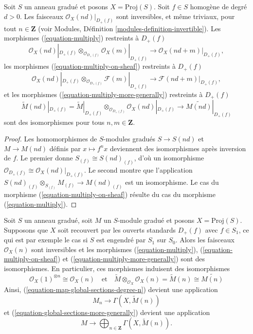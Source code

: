 \begin{lemma}
\label{lemma-when-invertible}
Soit $S$ un anneau gradué et posons $X = \text{Proj}(S)$. Soit
$f \in S$ homogène de degré $d > 0$. Les faisceaux
$\mathcal{O}_X(nd)|_{D_{+}(f)}$ sont inversibles, et même triviaux, pour tout
$n \in \mathbf{Z}$ (voir Modules,
Définition \ref{modules-definition-invertible}). Les morphismes
(\ref{equation-multiply}) restreints à $D_{+}(f)$
$$
\mathcal{O}_X(nd)|_{D_{+}(f)} \otimes_{\mathcal{O}_{D_{+}(f)}}
\mathcal{O}_X(m)|_{D_{+}(f)}
\longrightarrow
\mathcal{O}_X(nd + m)|_{D_{+}(f)},
$$
les morphismes (\ref{equation-multiply-on-sheaf}) restreints à $D_+(f)$
$$
\mathcal{O}_X(nd)|_{D_{+}(f)} \otimes_{\mathcal{O}_{D_{+}(f)}}
\mathcal{F}(m)|_{D_{+}(f)}
\longrightarrow
\mathcal{F}(nd + m)|_{D_{+}(f)},
$$
et les morphismes (\ref{equation-multiply-more-generally}) restreints à
$D_{+}(f)$
$$
\widetilde M(nd)|_{D_{+}(f)}
=
\widetilde M|_{D_{+}(f)}
\otimes_{\mathcal{O}_{D_{+}(f)}}
\mathcal{O}_X(nd)|_{D_{+}(f)}
\longrightarrow
\widetilde{M(nd)}|_{D_{+}(f)}
$$
sont des isomorphismes pour tous $n, m \in \mathbf{Z}$.
\end{lemma}

\begin{proof}
Les homomorphismes de $S$-modules gradués $S \to S(nd)$ et
$M \to M(nd)$ définis par $x \mapsto f^n x$ deviennent des isomorphismes
après inversion de $f$. Le premier donne $S_{(f)} \cong S(nd)_{(f)}$, d'où un isomorphisme
$\mathcal{O}_{D_{+}(f)} \cong \mathcal{O}_X(nd)|_{D_{+}(f)}$.
Le second montre que l'application
$S(nd)_{(f)} \otimes_{S_{(f)}} M_{(f)} \to M(nd)_{(f)}$ est un isomorphisme.
Le cas du morphisme (\ref{equation-multiply-on-sheaf}) résulte du cas du
morphisme (\ref{equation-multiply}).
\end{proof}

\begin{lemma}
\label{lemma-apply-modules}
Soit $S$ un anneau gradué, soit $M$ un $S$-module gradué et posons
$X = \text{Proj}(S)$. Supposons que $X$ soit recouvert par les ouverts
standards $D_+(f)$ avec $f \in S_1$, ce qui est par exemple le cas si $S$ est
engendré par $S_1$ sur $S_0$. Alors les faisceaux $\mathcal{O}_X(n)$ sont
inversibles et les morphismes (\ref{equation-multiply}),
(\ref{equation-multiply-on-sheaf}) et
(\ref{equation-multiply-more-generally}) sont des isomorphismes.
En particulier, ces morphismes induisent des isomorphismes
$$
\mathcal{O}_X(1)^{\otimes n} \cong
\mathcal{O}_X(n)
\quad
\text{et}
\quad
\widetilde{M} \otimes_{\mathcal{O}_X} \mathcal{O}_X(n) =
\widetilde{M}(n) \cong \widetilde{M(n)}
$$
Ainsi, (\ref{equation-map-global-sections-degree-n}) devient une application
\begin{equation}
\label{equation-map-global-sections-degree-n-simplified}
M_n \longrightarrow \Gamma(X, \widetilde{M}(n))
\end{equation}
et (\ref{equation-global-sections-more-generally}) devient une application
\begin{equation}
\label{equation-global-sections-more-generally-simplified}
M \longrightarrow
\bigoplus\nolimits_{n \in \mathbf{Z}} \Gamma(X, \widetilde{M}(n)).
\end{equation}
\end{lemma}


